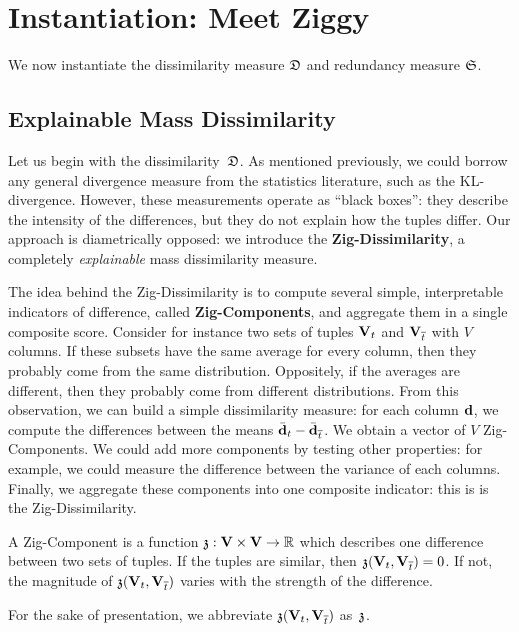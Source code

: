 \section{Instantiation: Meet Ziggy}
\label{sec:instantiation}
We now instantiate the dissimilarity measure $\mathfrak{D}$ and redundancy measure
$\mathfrak{S}$. 

\subsection{Explainable Mass Dissimilarity}
\label{sec:explain}
Let us begin with the dissimilarity~$\mathfrak{D}$. As mentioned previously, we could
borrow any general divergence measure from the statistics literature, such as
the KL-divergence. However, these measurements operate as ``black boxes'': they
describe the intensity of the differences, but they do not explain how the
tuples differ. Our approach is diametrically opposed: we introduce the
\textbf{Zig-Dissimilarity}, a completely \emph{explainable}  mass dissimilarity
measure.

The idea behind the Zig-Dissimilarity is to compute several simple,
interpretable indicators of difference, called \textbf{Zig-Components}, and
aggregate them in a single composite score.  Consider for instance two sets of
tuples $\mathbf{V}_t$ and $\mathbf{V}_{\overline{t}}$ with $V$ columns. If these subsets have
the same average for every column, then they probably come from the same
distribution. Oppositely, if the averages are different, then they probably
come from different distributions. From this observation, we can build a simple
dissimilarity measure: for each column $\bf{d}$, we compute the differences
between the means $\bar{\bf{d}}_t - \bar{\bf{d}}_{\overline{t}}$. We obtain
a vector of $V$ Zig-Components. We could add more components by testing other
properties: for example, we could measure the difference between the variance
of each columns.  Finally, we aggregate these components into one composite
indicator: this is is the Zig-Dissimilarity.

\begin{definition}
    A Zig-Component is a function $\mathfrak{z} : \mathbf{V}\times\mathbf{V} \to \mathbb{R}$
    which describes one difference between two sets of tuples. If the tuples
    are similar, then $\mathfrak{z}(\mathbf{V}_t, \mathbf{V}_{\overline{t}}) = 0$. If not,
    the magnitude of $\mathfrak{z}(\mathbf{V}_t, \mathbf{V}_{\overline{t}})$ varies with the strength
    of the difference.
\end{definition}
For the sake of presentation, we  abbreviate $\mathfrak{z}(\mathbf{V}_t, \mathbf{V}_{\overline{t}})$
as~$\mathfrak{z}$.

